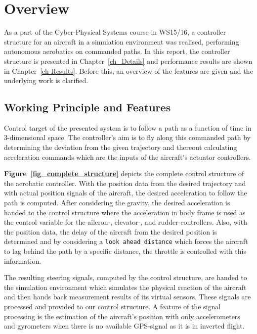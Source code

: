 \documentclass[11pt,a4paper]{scrartcl}		%
\begin{document}


\newpage
	

\section{Overview}

As a part of the Cyber-Physical Systems course in WS15/16, a controller structure for an aircraft in a simulation environment was realised, performing autonomous aerobatics on commanded paths.
In this report, the controller structure is presented in Chapter~\ref{ch_Details} and performance results are shown in Chapter~\ref{ch-Results}.
Before this, an overview of the features are given and the underlying work is clarified.

\medskip






\subsection{Working Principle and Features}

Control target of the presented system is to follow a path as a function of time in 3-dimensional space.
The controller's aim is to fly along this commanded path by determining the deviation from the given trajectory and thereout calculating acceleration commands which are the inputs of the aircraft's actuator controllers.

\textbf{Figure~\ref{fig_complete_structure}} depicts the complete control structure of the aerobatic controller. 
With the position data from the desired trajectory and with actual position signals of the aircraft, the desired acceleration to follow the path is computed.
After considering the gravity, the desired acceleration is handed to the control structure where the acceleration in body frame is used as the control variable for the aileron-, elevator-, and rudder-controllers.
Also, with the position data, the delay of the aircraft from the desired position is determined and by considering a \texttt{look ahead distance} which forces the aircraft to lag behind the path by a specific distance, the throttle is controlled with this information.

The resulting steering signals, computed by the control structure, are handed to the simulation environment which simulates the physical reaction of the aircraft and then hands back measurement results of its virtual sensors.
These signals are processed and provided to our control structure. 
A feature of the signal processing is the estimation of the aircraft's position with only accelerometers and gyrometers when there is no available GPS-signal as it is in inverted flight.
\end{document}
